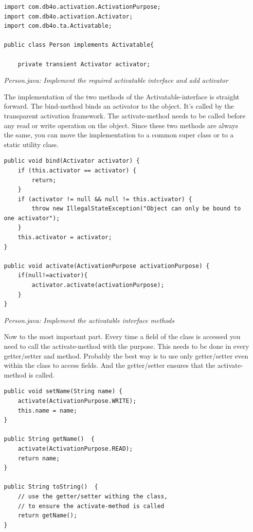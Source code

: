 \begin{lstlisting}
import com.db4o.activation.ActivationPurpose;
import com.db4o.activation.Activator;
import com.db4o.ta.Activatable;

public class Person implements Activatable{

    private transient Activator activator;
\end{lstlisting}

{\small\itshape Person.java: Implement the required activatable interface and add activator\par}
\medskip

The implementation of the two methods of the Activatable-interface is straight forward. The bind-method binds an activator to the object. It's called by the transparent activation framework. The activate-method needs to be called before any read or write operation on the object. Since these two methods are always the same, you can move the implementation to a common super class or to a static utility class.

\begin{lstlisting}
public void bind(Activator activator) {
    if (this.activator == activator) {
        return;
    }
    if (activator != null && null != this.activator) {
        throw new IllegalStateException("Object can only be bound to one activator");
    }
    this.activator = activator;
}

public void activate(ActivationPurpose activationPurpose) {
    if(null!=activator){
        activator.activate(activationPurpose);
    }
}
\end{lstlisting}

{\small\itshape Person.java: Implement the activatable interface methods\par}
\medskip

Now to the most important part. Every time a field of the class is accessed you need to call the activate-method with the purpose. This needs to be done in every getter/setter and method. Probably the best way is to use only getter/setter even within the class to access fields. And the getter/setter ensures that the activate-method is called.

\begin{lstlisting}
public void setName(String name) {
    activate(ActivationPurpose.WRITE);
    this.name = name;
}

public String getName()  {
    activate(ActivationPurpose.READ);
    return name;
}

public String toString()  {
    // use the getter/setter withing the class,
    // to ensure the activate-method is called
    return getName();
}
\end{lstlisting}

